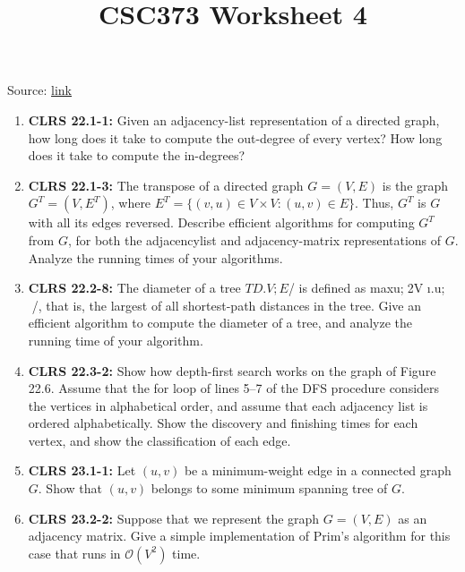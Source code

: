 \documentclass[12pt]{article}
\begin{document}
\title{CSC373 Worksheet 4}
\maketitle

\bigskip

Source: \href{http://www.cs.toronto.edu/~denisp/csc373/material.html}{link}

\bigskip

\begin{enumerate}[1.]
    \item \textbf{CLRS 22.1-1:} Given an adjacency-list representation of a directed graph, how long does it take
    to compute the out-degree of every vertex? How long does it take to compute the in-degrees?

    \item \textbf{CLRS 22.1-3:} The transpose of a directed graph $G = (V,E)$ is the graph $G^T = (V,E^T)$, where
    $E^T = \{(v,u) \in V \times V : (u,v) \in E\}$. Thus, $G^T$ is $G$ with all its edges reversed.
    Describe efficient algorithms for computing $G^T$ from $G$, for both the adjacencylist
    and adjacency-matrix representations of $G$. Analyze the running times of your
    algorithms.

    \item \textbf{CLRS 22.2-8:} The diameter of a tree $T D .V;E$/ is defined as maxu;2V ı.u; /, that is, the
    largest of all shortest-path distances in the tree. Give an efficient algorithm to
    compute the diameter of a tree, and analyze the running time of your algorithm.

    \item \textbf{CLRS 22.3-2:} Show how depth-first search works on the graph of Figure 22.6. Assume that the
    for loop of lines 5–7 of the DFS procedure considers the vertices in alphabetical
    order, and assume that each adjacency list is ordered alphabetically. Show the
    discovery and finishing times for each vertex, and show the classification of each
    edge.

    \item \textbf{CLRS 23.1-1:} Let $(u,v)$ be a minimum-weight edge in a connected graph $G$. Show that $(u,v)$
    belongs to some minimum spanning tree of $G$.

    \item \textbf{CLRS 23.2-2:} Suppose that we represent the graph $G = (V,E)$ as an adjacency matrix. Give a
    simple implementation of Prim’s algorithm for this case that runs in $\mathcal{O}(V^2)$ time.


\end{enumerate}
\end{document}
